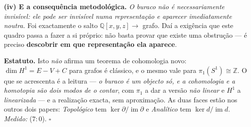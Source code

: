 \documentclass[livro.tex]{subfiles}
\begin{document}
\begin{teorema}
\textbf{(iv) E a consequência metodológica.} \emph{O buraco não é
necessariamente invisível: ele pode ser invisível numa representação e
aparecer imediatamente noutra.} Foi exactamente o salto
$\mathbb{Q}[x,y,z]\longrightarrow$ grafo. Daí a exigência que este
quadro passa a fazer a si próprio: não basta provar que existe uma
obstrução --- é preciso \textbf{descobrir em que representação ela
aparece}.

\textbf{Estatuto.} Isto \emph{não} afirma um teorema de cohomologia
novo: $\dim H^{1}=E-V+C$ para grafos é clássico, e o mesmo vale para
$\pi_1(S^1)\cong\mathbb{Z}$. O que se acrescenta é a leitura --- \emph{o
buraco é um objecto só, e a cohomologia e a homotopia são dois modos de
o contar}, com $\pi_1$ a dar a versão \emph{não linear} e $H^1$ a
\emph{linearizada} --- e a realização exacta, sem aproximação. As duas
faces estão nos outros dois papers:
\emph{Topológico} tem $\ker\partial/\operatorname{im}\partial$ e
\emph{Analítico} tem $\ker d/\operatorname{im}d$.
\emph{Medido:}  ($7{:}0$).
$\square$
\end{teorema}
\end{document}
